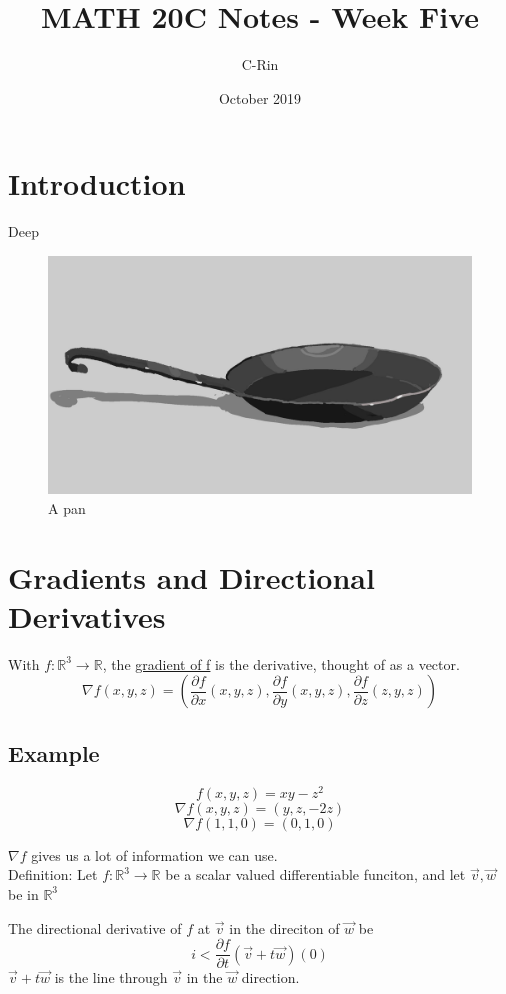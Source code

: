 \documentclass{article}
\title{MATH 20C Notes - Week Five}
\author{C-Rin}
\date{October 2019}
\begin{document}
\maketitle

\section*{Introduction}
Deep 

\begin{figure}[h!]
\centering
\includegraphics[scale=0.1]{pan.jpg}
\caption{A pan}
\end{figure}


\newpage
\section{Gradients and Directional Derivatives}
With $f:\mathbb{R}^3\rightarrow\mathbb{R}$, the \underline{gradient of f} is the derivative, thought of as a vector.
\[\nabla f(x,y,z)=(\frac{\partial f}{\partial x}(x,y,z),\frac{\partial f}{\partial y}(x,y,z),\frac{\partial f}{\partial z}(z,y,z))\]

\subsection*{Example}
\[f(x,y,z)=xy-z^2\]
\[\nabla f(x,y,z)=(y,z,-2z)\]
\[\nabla f(1,1,0)=(0,1,0)\]

$\nabla f$ gives us a lot of information we can use.\\
Definition: Let $f:\mathbb{R}^3\rightarrow\mathbb{R}$ be a scalar valued differentiable funciton, and let $\vec{v},\vec{w}$ be in $\mathbb{R}^3$

The directional derivative of $f$ at $\vec{v}$ in the direciton of $\vec{w}$ be
\[ i < \frac{\partial f}{\partial t}(\vec{v}+t\vec{w})(0)\]
$\vec{v}+t\vec{w}$ is the line through $\vec{v}$ in the $\vec{w}$ direction.
\end{document}
